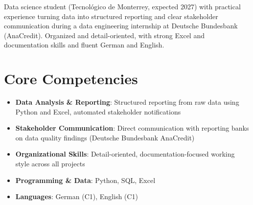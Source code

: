\documentclass[11pt,a4paper,sans]{moderncv}
\begin{document}
\makecvtitle


\vspace{6pt}
\small{Data science student (Tecnológico de Monterrey, expected 2027) with practical experience turning data into structured reporting and clear stakeholder communication during a data engineering internship at Deutsche Bundesbank (AnaCredit). Organized and detail-oriented, with strong Excel and documentation skills and fluent German and English.}


\section{Core Competencies}
\vspace{1pt}
\begin{itemize}

\item \textbf{Data Analysis \& Reporting}: Structured reporting from raw data using Python and Excel, automated stakeholder notifications

\item \textbf{Stakeholder Communication}: Direct communication with reporting banks on data quality findings (Deutsche Bundesbank AnaCredit)

\item \textbf{Organizational Skills}: Detail-oriented, documentation-focused working style across all projects

\item \textbf{Programming \& Data}: Python, SQL, Excel

\item \textbf{Languages}: German (C1), English (C1)

\end{itemize}

\end{document}
